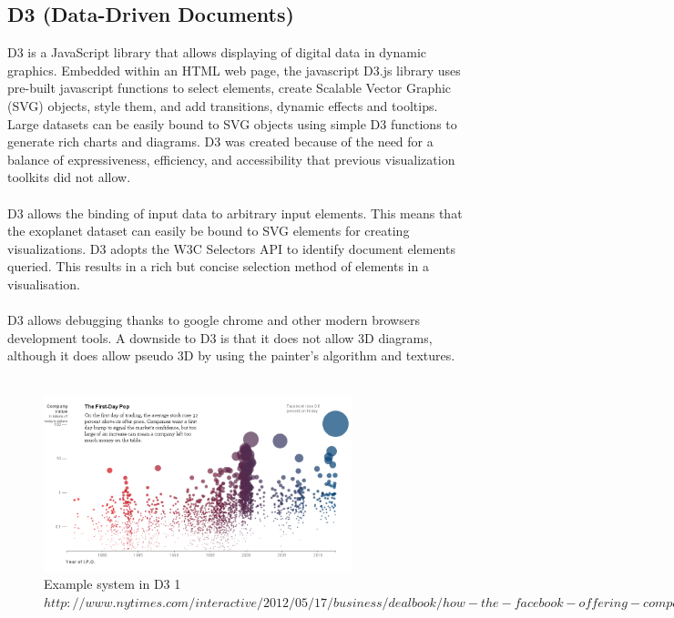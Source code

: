 \documentclass[11pt
              , a4paper
              , twoside
              , openright
              ]{report}
\begin{document}
\subsection{D3 (Data-Driven Documents)}
D3 is a JavaScript library that allows displaying of digital data in dynamic graphics. Embedded within an HTML web page, the javascript D3.js library uses pre-built javascript functions to select elements, create Scalable Vector Graphic (SVG) objects, style them, and add transitions, dynamic effects and tooltips. Large datasets can be easily bound to SVG objects using simple D3 functions to generate rich charts and diagrams. D3 was created because of the need for a balance of expressiveness, efficiency, and accessibility that previous visualization toolkits did not allow. 
\\\\
D3 allows the binding of input data to arbitrary input elements. This means that the exoplanet dataset can easily be bound to SVG elements for creating visualizations. D3 adopts the W3C Selectors API to identify document elements queried. This results in a rich but concise selection method of elements in a visualisation. 
\\\\
D3 allows debugging thanks to google chrome and other modern browsers development tools. A downside to D3 is that it does not allow 3D diagrams, although it does allow pseudo 3D by using the painter's algorithm and textures.
\\\\
\begin{figure}[h!]
  \centering
      \includegraphics[width=0.8\textwidth]{images/d31.jpg}
  \caption{Example system in D3 1 $http://www.nytimes.com/interactive/2012/05/17/business/dealbook/how-the-facebook-offering-compares.html$}
\end{figure}
\\\\
\end{document}
